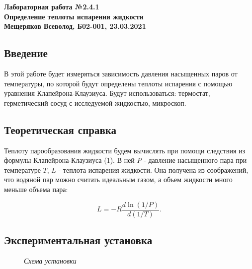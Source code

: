 \documentclass[a4paper, fontsize = 14pt]{article}
\begin{document}
\begin{center} \textbf{
Лабораторная работа №2.4.1 \\ Определение теплоты испарения жидкости \\
Мещеряков Всеволод, Б02-001, 23.03.2021}
\end{center} 

\subsection*{Введение}

В этой работе будет измеряться зависимость давления насыщенных паров от температуры, по которой будут определены теплоты испарения с помощью уравнения Клапейрона-Клаузиуса. Будут использоваться: термостат, герметический сосуд с исследуемой жидкостью, микроскоп.

\subsection*{Теоретическая справка}

Теплоту парообразования жидкости будем вычислять при помощи следствия из формулы Клапейрона-Клаузиуса (1). В ней $P$ - давление насыщенного пара при температуре $T$, $L$ - теплота испарения жидкости. Она получена из соображений, что водяной пар можно считать идеальным газом, а объем жидкости много меньше объема пара:

\begin{equation}
	L = - R \frac{d\ln(1/P)}{d(1/T)}.
\end{equation}

\subsection*{Экспериментальная установка}

\begin{figure}[hbt]\label{risI}
\caption{\textit{Схема установки}}
\end{figure}
\end{document}
